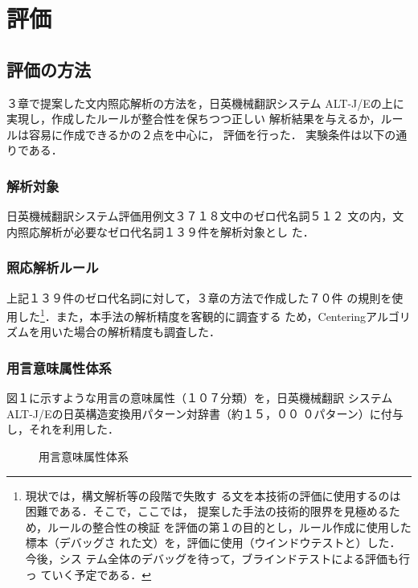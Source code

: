 \section{評価}

\subsection{評価の方法}

３章で提案した文内照応解析の方法を，日英機械翻訳システム
ALT-J/Eの上に実現し，作成したルールが整合性を保ちつつ正しい
解析結果を与えるか，ルールは容易に作成できるかの２点を中心に，
評価を行った．
実験条件は以下の通りである．

\subsubsection{解析対象}

日英機械翻訳システム評価用例文３７１８文中のゼロ代名詞５１２
文の内，文内照応解析が必要なゼロ代名詞１３９件を解析対象とし
た．

\subsubsection{照応解析ルール}

上記１３９件のゼロ代名詞に対して，３章の方法で作成した７０件
の規則を使用した\footnote{現状では，構文解析等の段階で失敗す
る文を本技術の評価に使用するのは困難である．そこで，ここでは，
提案した手法の技術的限界を見極めるため，ルールの整合性の検証
を評価の第１の目的とし，ルール作成に使用した標本（デバッグさ
れた文）を，評価に使用（ウインドウテストと）した．今後，シス
テム全体のデバッグを待って，ブラインドテストによる評価も行っ
ていく予定である．}．また，本手法の解析精度を客観的に調査する
ため，Centeringアルゴリズムを用いた場合の解析精度も調査した．

\subsubsection{用言意味属性体系}

図１に示すような用言の意味属性（１０７分類）を，日英機械翻訳
システムALT-J/Eの日英構造変換用パターン対辞書（約１５，００
０パターン）に付与し，それを利用した\cite{NakaiwaYokooIkehara1994}．

\begin{figure}[htbp]
\begin{center}

\end{center}
\caption{用言意味属性体系}
\label{fig:vsa}
\end{figure}

